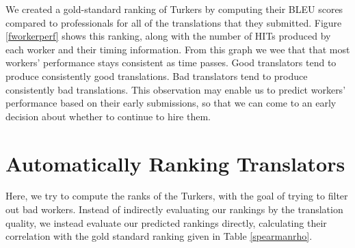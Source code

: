 \documentclass[11pt]{article}
\begin{document}
We created a gold-standard ranking of Turkers by computing their BLEU scores compared to professionals for all of the translations that they submitted.  %
Figure \ref{fworkerperf} shows this ranking, along with the number of HITs produced by each worker and their timing information.
From this graph we wee that that most workers' performance stays
consistent as time passes.  Good translators tend to produce consistently good translations.  Bad translators tend to produce consistently bad translations.  This observation may enable us to predict workers' performance based on their early submissions, so that we can come to an early decision about whether to continue to hire them. 


\section{Automatically Ranking Translators}


Here, we try to compute the ranks of the Turkers, with the goal of trying to filter out bad workers.  Instead of indirectly evaluating our rankings by the translation quality, we instead evaluate our predicted rankings directly, calculating their correlation with the gold standard ranking given in Table \ref{spearmanrho}.
\end{document}
